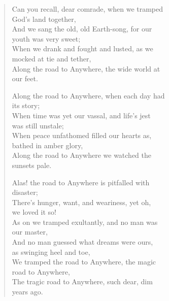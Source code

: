 
\begin{verse}    
Can you recall, dear comrade, when we tramped\\
\idt God's land together,\\
And we sang the old, old Earth-song, for our\\
\idt youth was very sweet;\\
When we drank and fought and lusted, as we\\
\idt mocked at tie and tether,\\
Along the road to Anywhere, the wide world at\\
\idt our feet.

Along the road to Anywhere, when each day had\\
\idt its story;\\
When time was yet our vassal, and life's jest\\
\idt was still unstale;\\
When peace unfathomed filled our hearts as,\\
\idt bathed in amber glory,\\
Along the road to Anywhere we watched the\\
\idt sunsets pale.

Alas! the road to Anywhere is pitfalled with\\
\idt disaster;\\
There's hunger, want, and weariness, yet oh,\\
\idt we loved it so!\\
As on we tramped exultantly, and no man was\\
\idt our master,\\
And no man guessed what dreams were ours,\\
\idt as swinging heel and toe,\\
We tramped the road to Anywhere, the magic\\
\idt road to Anywhere,\\
The tragic road to Anywhere, such dear, dim\\
\idt years ago.
\end{verse}
